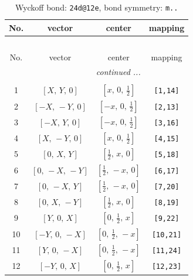 \documentclass[fleqn,8pt]{jsarticle}
\begin{document}
\begin{longtable}{cccc}
\caption{Wyckoff bond: {\tt 24d@12e}, bond symmetry: {\tt m..}}
 \\
 \hline \hline
No. & vector & center & mapping \\ \hline \endfirsthead

\multicolumn{3}{l}{\tablename\ \thetable{}} \\
 \hline \hline
No. & vector & center & mapping \\ \hline \endhead

 \hline \hline
\multicolumn{3}{r}{\footnotesize\it continued ...} \\ \endfoot

 \hline \hline
\multicolumn{3}{r}{} \\ \endlastfoot

1 & $\left[ X,\, Y,\, 0 \right]$ & $\left[ x,\, 0,\, \frac{1}{2} \right]$ & {\tt [1,14]} \\ \hline
2 & $\left[ - X,\, - Y,\, 0 \right]$ & $\left[ - x,\, 0,\, \frac{1}{2} \right]$ & {\tt [2,13]} \\ \hline
3 & $\left[ - X,\, Y,\, 0 \right]$ & $\left[ - x,\, 0,\, \frac{1}{2} \right]$ & {\tt [3,16]} \\ \hline
4 & $\left[ X,\, - Y,\, 0 \right]$ & $\left[ x,\, 0,\, \frac{1}{2} \right]$ & {\tt [4,15]} \\ \hline
5 & $\left[ 0,\, X,\, Y \right]$ & $\left[ \frac{1}{2},\, x,\, 0 \right]$ & {\tt [5,18]} \\ \hline
6 & $\left[ 0,\, - X,\, - Y \right]$ & $\left[ \frac{1}{2},\, - x,\, 0 \right]$ & {\tt [6,17]} \\ \hline
7 & $\left[ 0,\, - X,\, Y \right]$ & $\left[ \frac{1}{2},\, - x,\, 0 \right]$ & {\tt [7,20]} \\ \hline
8 & $\left[ 0,\, X,\, - Y \right]$ & $\left[ \frac{1}{2},\, x,\, 0 \right]$ & {\tt [8,19]} \\ \hline
9 & $\left[ Y,\, 0,\, X \right]$ & $\left[ 0,\, \frac{1}{2},\, x \right]$ & {\tt [9,22]} \\ \hline
10 & $\left[ - Y,\, 0,\, - X \right]$ & $\left[ 0,\, \frac{1}{2},\, - x \right]$ & {\tt [10,21]} \\ \hline
11 & $\left[ Y,\, 0,\, - X \right]$ & $\left[ 0,\, \frac{1}{2},\, - x \right]$ & {\tt [11,24]} \\ \hline
12 & $\left[ - Y,\, 0,\, X \right]$ & $\left[ 0,\, \frac{1}{2},\, x \right]$ & {\tt [12,23]} \\
\end{longtable}
\end{document}
